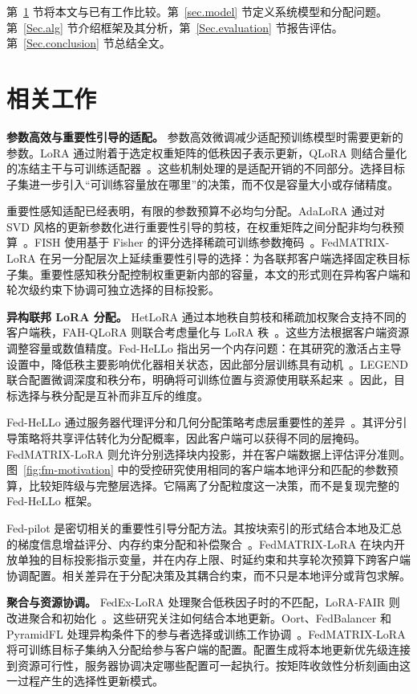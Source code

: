 \documentclass[10pt,conference,letterpaper]{IEEEtran}
\begin{document}
第~\ref{Sec.relatedworks} 节将本文与已有工作比较。第~\ref{sec.model} 节定义系统模型和分配问题。第~\ref{Sec.alg} 节介绍框架及其分析，第~\ref{Sec.evaluation} 节报告评估。第~\ref{Sec.conclusion} 节总结全文。

\section{相关工作}\label{Sec.relatedworks}
\noindent\textbf{参数高效与重要性引导的适配。}
参数高效微调减少适配预训练模型时需要更新的参数。LoRA 通过附着于选定权重矩阵的低秩因子表示更新，QLoRA 则结合量化的冻结主干与可训练适配器~\cite{hu2022lora,dettmers2023qlora}。这些机制处理的是适配开销的不同部分。选择目标子集进一步引入“可训练容量放在哪里”的决策，而不仅是容量大小或存储精度。

重要性感知适配已经表明，有限的参数预算不必均匀分配。AdaLoRA 通过对 SVD 风格的更新参数化进行重要性引导的剪枝，在权重矩阵之间分配非均匀秩预算~\cite{fm_adalora2023}。FISH 使用基于 Fisher 的评分选择稀疏可训练参数掩码~\cite{fm_fish2021}。FedMATRIX-LoRA 在另一分配层次上延续重要性引导的选择：为各联邦客户端选择固定秩目标子集。重要性感知秩分配控制权重更新内部的容量，本文的形式则在异构客户端和轮次级约束下协调可独立选择的目标投影。

\noindent\textbf{异构联邦 LoRA 分配。}
HetLoRA 通过本地秩自剪枝和稀疏加权聚合支持不同的客户端秩，FAH-QLoRA 则联合考虑量化与 LoRA 秩~\cite{cho2024hetlora,gao2025fah}。这些方法根据客户端资源调整容量或数值精度。Fed-HeLLo 指出另一个内存问题：在其研究的激活占主导设置中，降低秩主要影响优化器相关状态，因此部分层训练具有动机~\cite{zhang2025fedhello}。LEGEND 联合配置微调深度和秩分布，明确将可训练位置与资源使用联系起来~\cite{liu2025legend}。因此，目标选择与秩分配是互补而非互斥的维度。

Fed-HeLLo 通过服务器代理评分和几何分配策略考虑层重要性的差异~\cite{zhang2025fedhello}。其评分引导策略将共享评估转化为分配概率，因此客户端可以获得不同的层掩码。FedMATRIX-LoRA 则允许分别选择块内投影，并在客户端数据上评估评分准则。图~\ref{fig:fm-motivation} 中的受控研究使用相同的客户端本地评分和匹配的参数预算，比较矩阵级与完整层选择。它隔离了分配粒度这一决策，而不是复现完整的 Fed-HeLLo 框架。

Fed-pilot 是密切相关的重要性引导分配方法。其按块索引的形式结合本地及汇总的梯度信息增益评分、内存约束分配和补偿聚合~\cite{fm_fedpilot2025}。FedMATRIX-LoRA 在块内开放单独的目标投影指示变量，并在内存上限、时延约束和共享轮次预算下跨客户端协调配置。相关差异在于分配决策及其耦合约束，而不只是本地评分或背包求解。

\noindent\textbf{聚合与资源协调。}
FedEx-LoRA 处理聚合低秩因子时的不匹配，LoRA-FAIR 则改进聚合和初始化~\cite{singhal2025fedex,bian2025lorafair}。这些研究关注如何结合本地更新。Oort、FedBalancer 和 PyramidFL 处理异构条件下的参与者选择或训练工作协调~\cite{lai2021oort,shin2022fedbalancer,li2022pyramidfl}。FedMATRIX-LoRA 将可训练目标子集纳入分配给参与客户端的配置。配置生成将本地更新优先级连接到资源可行性，服务器协调决定哪些配置可一起执行。按矩阵收敛性分析刻画由这一过程产生的选择性更新模式。
\end{document}
